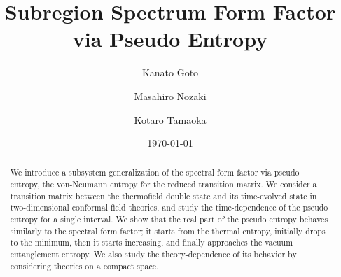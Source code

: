 \documentclass[%
twocolumn, 
secnumarabic,amssymb, preprintnumbers, superscriptaddress, aps, prl]{revtex4-1}
\begin{document}
\title{%
Subregion Spectrum Form Factor via Pseudo Entropy}
\date{\today}
\author{Kanato Goto}
\author{Masahiro Nozaki}
\author{Kotaro Tamaoka}

\begin{abstract}
We introduce a subsystem generalization of the spectral form factor via pseudo entropy, the von-Neumann entropy for the reduced transition matrix. We consider a transition matrix between the thermofield double state and its time-evolved state in two-dimensional conformal field theories, and study the time-dependence of the pseudo entropy for a single interval. We show that the real part of the pseudo entropy behaves similarly to the spectral form factor; it starts from the thermal entropy, initially drops to the minimum, then it starts increasing, and finally approaches the vacuum entanglement entropy. We also study the theory-dependence of its behavior by considering theories on a compact space. 
\end{abstract}
\maketitle
\noindent
\end{document}
